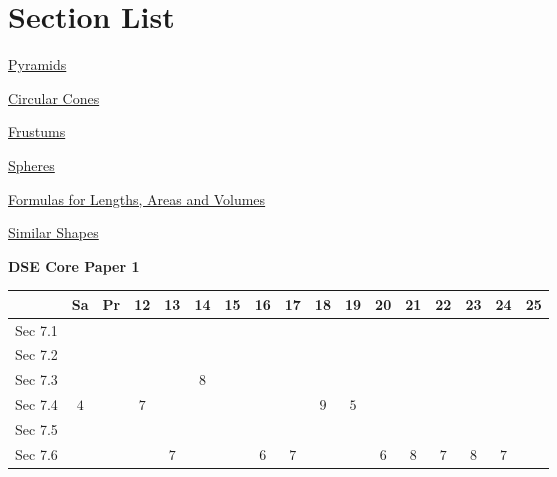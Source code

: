 \documentclass[12pt, a4paper]{article}
\begin{document}
\section*{Section List}
\begin{enumx}[label=Sec 7.\arabic*\ ]
\item \hyperref[section:3-7-1]{Pyramids}
\item \hyperref[section:3-7-2]{Circular Cones}
\item \hyperref[section:3-7-3]{Frustums}
\item \hyperref[section:3-7-4]{Spheres}
\item \hyperref[section:3-7-5]{Formulas for Lengths, Areas and Volumes}
\item \hyperref[section:3-7-6]{Similar Shapes}
\end{enumx}
\begin{absolutelynopagebreak}
\begin{center}
\textbf{DSE Core Paper 1}
\end{center}
\begin{center}
\begin{tabular}{|l|c|c|c|c|c|c|c|c|c|c|c|c|c|c|c|c|}
\hline
        & Sa & Pr & 12 & 13 & 14 & 15 & 16 & 17 & 18 & 19 & 20 & 21 & 22 & 23 & 24 & 25 \\\hline\hline
Sec 7.1 &  &  &  &  &  &  &  &  &  &  &  &  &  &  &  &  \\\hline
Sec 7.2 &  &  &  &  &  &  &  &  &  &  &  &  &  &  &  &  \\\hline
Sec 7.3 &  &  &  &  &  $8$ &  &  &  &  &  &  &  &  &  &  &  \\\hline
Sec 7.4 &  $4$ &  &  $7$ &  &  &  &  &  &  $9$ &  $5$ &  &  &  &  &  &  \\\hline
Sec 7.5 &  &  &  &  &  &  &  &  &  &  &  &  &  &  &  &  \\\hline
Sec 7.6 &  &  &  &  $7$ &  &  &  $6$ &  $7$ &  &  &  $6$ &  $8$ &  $7$ &  $8$ &  $7$ &  \\\hline
\end{tabular}
\end{center}
\end{absolutelynopagebreak}
\end{document}
